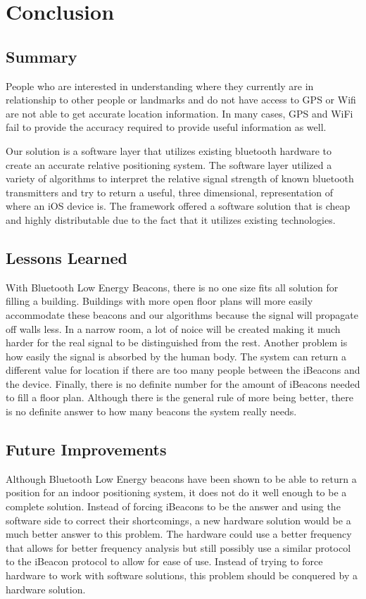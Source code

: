 \chapter{Conclusion}
\section{Summary}

People who are interested in understanding where they currently are in relationship to other people or landmarks and do
not have access to GPS or Wifi are not able to get accurate location information. In many cases, GPS and WiFi fail to provide the
accuracy required to provide useful information as well.
\newline \par
Our solution is a software layer that utilizes existing bluetooth
hardware to create an accurate relative positioning system. The software layer utilized a variety of algorithms to interpret the
relative signal strength of known bluetooth transmitters and try to return a useful, three dimensional, representation of
where an iOS device is. The framework offered a software solution that is cheap and
highly distributable due to the fact that it utilizes existing technologies.

\section{Lessons Learned}

With Bluetooth Low Energy Beacons, there is no one size fits all solution for filling a building. Buildings with more open floor plans will more easily accommodate
these beacons and our algorithms because the signal will propagate off walls less. In a narrow room, a lot of noice will be created making it much harder for the real signal to be distinguished from the rest.
Another problem is how easily the signal is absorbed by the human body. The system can return a different value for location if there are too many people between the iBeacons and the device. Finally, there is no definite number for the amount of iBeacons
needed to fill a floor plan. Although there is the general rule of more being better, there is no definite answer to how many beacons the system really needs.

\section{Future Improvements}

Although Bluetooth Low Energy beacons have been shown to be able to return a position for an indoor positioning system, it does not do it well enough
to be a complete solution. Instead of forcing iBeacons to be the answer and using the software side to correct their shortcomings, a new hardware solution
would be a much better answer to this problem. The hardware could use a better frequency that allows for better frequency analysis but still possibly use
a similar protocol to the iBeacon protocol to allow for ease of use. Instead of trying to force hardware to work with software solutions, this problem should be conquered
by a hardware solution.
